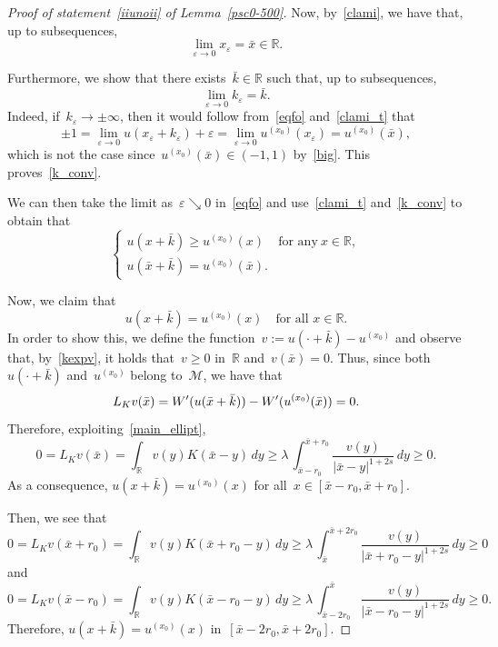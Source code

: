 \documentclass[10pt,a4paper]{amsart}
\numberwithin{equation}{section}
\newcommand{\R}{\mathbb{R}}
\renewcommand{\epsilon}{\varepsilon}
\begin{document}
\begin{proof}[Proof of statement~\eqref{iiunoii} of Lemma~\eqref{psc0-500}]
Now, by~\eqref{clami}, we have that, up to subsequences,
\begin{equation}\label{clami_t}
\lim_{\epsilon \to 0} x_{\epsilon} = \bar{x}\in\R.
\end{equation}

Furthermore, we show that there exists~$\bar{k}\in \R$ such that, up to subsequences,
\begin{equation}\label{k_conv}
\lim_{\epsilon \to 0} k_{\epsilon} = \bar{k}.
\end{equation}
Indeed, if~$k_{\epsilon}\to\pm \infty$, then it would follow from~\eqref{eqfo} and~\eqref{clami_t} that
\begin{equation*}
\pm 1=\lim_{\epsilon\to 0}  u(x_{\epsilon}+k_{\epsilon})+\epsilon= \lim_{\epsilon\to 0} u^{(x_0)}(x_{\epsilon}) =  u^{(x_0)}(\bar{x}),
\end{equation*}
which is not the case since~$u^{(x_0)}(\bar{x}) \in (-1,1)$ by~\eqref{big}. This proves~\eqref{k_conv}.

We can then take the limit as~$\epsilon\searrow0$ in~\eqref{eqfo}
and use~\eqref{clami_t} and~\eqref{k_conv} to obtain that
\begin{equation}\label{kexpv}
\begin{cases}
u(x+\bar{k})\geq u^{(x_0)}(x)  &\text{for any} \ x \in \R,\\
u(\bar{x}+\bar{k})= u^{(x_0)}(\bar{x}).
\end{cases}
\end{equation}

Now, we claim that
\begin{equation}\label{dxgide}
u(x+\bar{k})= u^{(x_0)}(x) \quad\mbox{for all } x\in \R.
\end{equation}
In order to show this, we define the function~$v:=u(\cdot +\bar{k})- u^{(x_0)}$ and observe that, by~\eqref{kexpv}, it holds that~$v\geq 0$ in~$\R$ and~$v(\bar{x})=0$. Thus, since both~$u(\cdot +\bar{k})$ and~$u^{(x_0)}$ belong to~$\mathscr{M}$, we have that
$$
{L}_K v (\bar{x})= W\rq{}(u(\bar{x}+\bar{k})) -W\rq{}(u^{(x_0)}(\bar{x}))=0.
$$
Therefore, exploiting~\eqref{main_ellipt},
\begin{equation*}
0= {L}_K v(\bar{x}) = \int_{\R} v(y) K(\bar{x}-y) \, dy \geq \lambda \, \int_{\bar{x}-r_0}^{\bar{x}+r_0} \frac{v(y)}{| \bar{x}- y |^{1+2s}}\, dy \geq 0 .
\end{equation*}
As a consequence, $u(x+\bar{k})=u^{(x_0)}(x)$ for all~$x\in[\bar{x}-r_0, \bar{x}+r_0]$.

Then, we see that
\begin{equation*}
0= {L}_K v(\bar{x}+r_0) = \int_{\R} v(y) K(\bar{x}+r_0-y) \, dy \geq \lambda \, \int_{\bar{x}}^{\bar{x}+2r_0} \frac{v(y)}{| \bar{x}+r_0- y |^{1+2s}}\, dy \geq 0 
\end{equation*}
and
\begin{equation*}
0= {L}_K v(\bar{x}-r_0) = \int_{\R} v(y) K(\bar{x}-r_0-y) \, dy \geq \lambda \, \int_{\bar{x}-2r_0}^{\bar{x}} \frac{v(y)}{|\bar{x}-r_0- y |^{1+2s}}\, dy \geq 0.
\end{equation*}
Therefore, $u(x+\bar{k})=u^{(x_0)}(x)$ in~$[\bar{x}-2r_0, \bar{x}+2r_0]$.


\end{proof}
\end{document}
